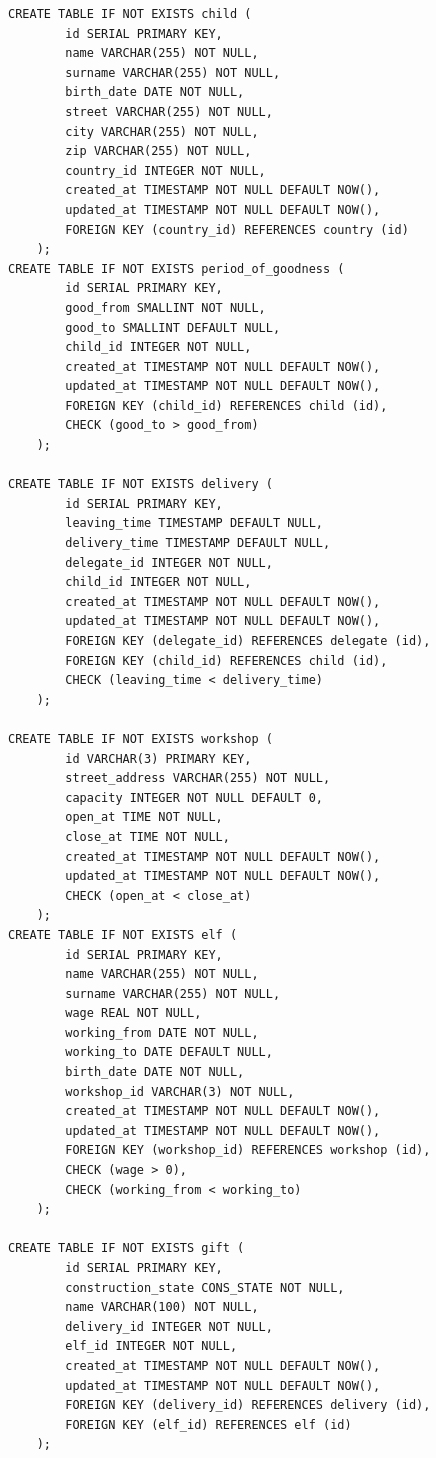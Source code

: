 \documentclass[12pt]{report}
\begin{document}
\begin{lstlisting}
CREATE TABLE IF NOT EXISTS child (
        id SERIAL PRIMARY KEY,
        name VARCHAR(255) NOT NULL,
        surname VARCHAR(255) NOT NULL,
        birth_date DATE NOT NULL,
        street VARCHAR(255) NOT NULL,
        city VARCHAR(255) NOT NULL,
        zip VARCHAR(255) NOT NULL,
        country_id INTEGER NOT NULL,
        created_at TIMESTAMP NOT NULL DEFAULT NOW(),
        updated_at TIMESTAMP NOT NULL DEFAULT NOW(),
        FOREIGN KEY (country_id) REFERENCES country (id)
    );
CREATE TABLE IF NOT EXISTS period_of_goodness (
        id SERIAL PRIMARY KEY,
        good_from SMALLINT NOT NULL,
        good_to SMALLINT DEFAULT NULL,
        child_id INTEGER NOT NULL,
        created_at TIMESTAMP NOT NULL DEFAULT NOW(),
        updated_at TIMESTAMP NOT NULL DEFAULT NOW(),
        FOREIGN KEY (child_id) REFERENCES child (id),
        CHECK (good_to > good_from)
    );

CREATE TABLE IF NOT EXISTS delivery (
        id SERIAL PRIMARY KEY,
        leaving_time TIMESTAMP DEFAULT NULL,
        delivery_time TIMESTAMP DEFAULT NULL,
        delegate_id INTEGER NOT NULL,
        child_id INTEGER NOT NULL,
        created_at TIMESTAMP NOT NULL DEFAULT NOW(),
        updated_at TIMESTAMP NOT NULL DEFAULT NOW(),
        FOREIGN KEY (delegate_id) REFERENCES delegate (id),
        FOREIGN KEY (child_id) REFERENCES child (id),
        CHECK (leaving_time < delivery_time)
    );

CREATE TABLE IF NOT EXISTS workshop (
        id VARCHAR(3) PRIMARY KEY,
        street_address VARCHAR(255) NOT NULL,
        capacity INTEGER NOT NULL DEFAULT 0,
        open_at TIME NOT NULL,
        close_at TIME NOT NULL,
        created_at TIMESTAMP NOT NULL DEFAULT NOW(),
        updated_at TIMESTAMP NOT NULL DEFAULT NOW(),
        CHECK (open_at < close_at)
    );
CREATE TABLE IF NOT EXISTS elf (
        id SERIAL PRIMARY KEY,
        name VARCHAR(255) NOT NULL,
        surname VARCHAR(255) NOT NULL,
        wage REAL NOT NULL,
        working_from DATE NOT NULL,
        working_to DATE DEFAULT NULL,
        birth_date DATE NOT NULL,
        workshop_id VARCHAR(3) NOT NULL,
        created_at TIMESTAMP NOT NULL DEFAULT NOW(),
        updated_at TIMESTAMP NOT NULL DEFAULT NOW(),
        FOREIGN KEY (workshop_id) REFERENCES workshop (id),
        CHECK (wage > 0),
        CHECK (working_from < working_to)
    );

CREATE TABLE IF NOT EXISTS gift (
        id SERIAL PRIMARY KEY,
        construction_state CONS_STATE NOT NULL,
        name VARCHAR(100) NOT NULL,
        delivery_id INTEGER NOT NULL,
        elf_id INTEGER NOT NULL,
        created_at TIMESTAMP NOT NULL DEFAULT NOW(),
        updated_at TIMESTAMP NOT NULL DEFAULT NOW(),
        FOREIGN KEY (delivery_id) REFERENCES delivery (id),
        FOREIGN KEY (elf_id) REFERENCES elf (id)
    );


\end{lstlisting}
\end{document}
